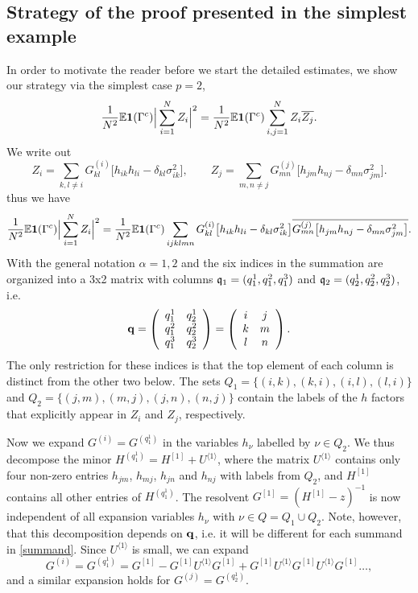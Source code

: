 \documentclass[draft]{article}
\newcommand{\bq}{{\bf {q}}}
\newcommand{\fq}{{\frak q}}
\newcommand{\be}{\begin{equation}}
\newcommand{\ee}{\end{equation}}
\newcommand{\ov}{\overline}
\newcommand{\E}{{\mathbb E }}
\numberwithin{equation}{section}
\numberwithin{theorem}{section}
\numberwithin{definition}{section}
\numberwithin{remark}{section}
\begin{document}
\subsection{Strategy of the proof presented in the simplest example}


In order to motivate the reader
before we start the detailed estimates, 
we show our strategy
via the simplest case $p=2$,
$$
    \frac{1}{N^2} \E {\bf 1}(\Gamma^c) \Big|\sum_{i=1}^N Z_i\Big|^2
   =   \frac{1}{N^2} \E {\bf 1}(\Gamma^c)\sum_{i, j=1}^N 
  Z_i \overline{Z_j}.
$$
We write out
$$
  Z_i = \sum_{k,l\ne i} G_{kl}^{(i)} \big[ h_{ik}h_{li} - \delta_{kl}\sigma_{ik}^2\big],
  \qquad 
 Z_j = \sum_{m,n\ne j} G_{mn}^{(j)} \big[ h_{jm}h_{nj} - \delta_{mn}\sigma_{jm}^2\big].
$$
thus we have
\be\label{summand}
 \frac{1}{N^2} \E {\bf 1}(\Gamma^c) \Big|\sum_{i=1}^N Z_i\Big|^2
 = \frac{1}{N^2} \E {\bf 1}(\Gamma^c)
\sum_{ijklmn}G_{kl}^{(i)} \big[ h_{ik}h_{li} - \delta_{kl}\sigma_{ik}^2\big]
  \ov{G_{mn}^{(j)} \big[ h_{jm}h_{nj} - \delta_{mn}\sigma_{jm}^2\big]}.
\ee
With the general notation $\alpha=1,2$ and
the six indices in the summation are organized into a
 3x2 matrix with columns $\fq_1 = (q_1^1, q_1^2, q_1^3)$
and $\fq_2= (q_2^1, q_2^2, q_2^3)$, i.e.
$$
   \bq =  \left(\begin{array}{cc} q_1^1 & q_2^1 \cr
q_1^2 & q_2^2 \cr
q_1^3 & q_2^3
\end{array}\right)=
\left(\begin{array}{cc} i & j \cr
k & m \cr
l & n
\end{array}\right).
$$
The only restriction for these indices is that the top
element of each column is distinct from the other two below.
The sets $Q_1 =\{ (i,k), (k,i), (i,l), (l,i)\} $ and $Q_2
= \{ (j,m), (m,j), (j,n), (n,j)\}$ contain the labels
of the $h$ factors that explicitly appear in $Z_i$ and $Z_j$, respectively.



Now we expand $G^{(i)}= G^{(q_1^1)}$ in the variables $h_\nu$ labelled by $\nu \in Q_2$.
We thus decompose the minor $H^{(q_1^1)} = H^{[1]}+ U^{\langle 1\rangle}$, where
 the  matrix $U^{\langle 1\rangle}$ contains
 only four non-zero entries  $h_{jm}$, $h_{mj}$, $h_{jn}$ and $h_{nj}$
with labels from $Q_2$,
and $H^{[1]}$ contains all other entries of $H^{(q_1^1)}$. 
The resolvent $G^{[1]} = (H^{[1]}-z)^{-1}$ is now independent of
all expansion variables $h_\nu$ with $\nu\in Q=Q_1\cup Q_2$.
Note, however, that this decomposition depends on $\bq$, i.e.
it will be different for each summand in \eqref{summand}.
Since $U^{\langle 1\rangle}$ is small, we can expand
$$
   G^{(i)}= G^{(q_1^1)} = G^{[1]}  - G^{[1]} U^{\langle 1\rangle} G^{[1]} + 
 G^{[1]} U^{\langle 1\rangle} G^{[1]} U^{\langle 1\rangle} G^{[1]}
\ldots,
$$
and a similar expansion holds for $G^{(j)}= G^{(q_2^1)}$.
\end{document}
